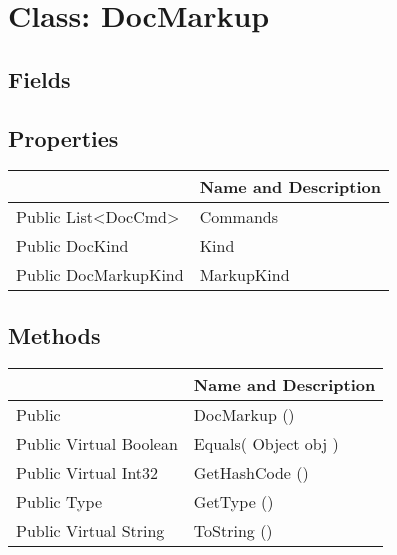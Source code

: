 \documentclass[11pt, oneside, a4paper]{book}
\begin{document}
\hypertarget{SoftwareEngineeringTools.{}Documentation.{}DocMarkup}{}
\section{Class: DocMarkup}

\subsection{Fields}

\subsection{Properties}
\begin{center}
\begin{tabular}{| p{3cm} | p{12cm} | }
\hline
\textbf{ } & \textbf{ Name and Description}\\
\hline
 Public  List<DocCmd> &  Commands\hypertarget{SoftwareEngineeringTools.{}Documentation.{}DocMarkup.{}Commands}{}\\
\hline
 Public  DocKind &  Kind\hypertarget{SoftwareEngineeringTools.{}Documentation.{}DocMarkup.{}Kind}{}\\
\hline
 Public  DocMarkupKind &  MarkupKind\hypertarget{SoftwareEngineeringTools.{}Documentation.{}DocMarkup.{}MarkupKind}{}\\
\hline
\end{tabular}
\end{center}

\subsection{Methods}
\begin{center}
\begin{tabular}{| p{3cm} | p{12cm} | }
\hline
\textbf{ } & \textbf{ Name and Description}\\
\hline
 Public  &  DocMarkup ()\hypertarget{SoftwareEngineeringTools.{}Documentation.{}DocMarkup.{}DocMarkup}{}\\
\hline
 Public  Virtual  Boolean &  Equals(\hypertarget{SoftwareEngineeringTools.{}Documentation.{}DocMarkup.{}Equals\_Object}{} Object  obj  )\\
\hline
 Public  Virtual  Int32 &  GetHashCode ()\hypertarget{SoftwareEngineeringTools.{}Documentation.{}DocMarkup.{}GetHashCode}{}\\
\hline
 Public  Type &  GetType ()\hypertarget{SoftwareEngineeringTools.{}Documentation.{}DocMarkup.{}GetType}{}\\
\hline
 Public  Virtual  String &  ToString ()\hypertarget{SoftwareEngineeringTools.{}Documentation.{}DocMarkup.{}ToString}{}\\
\hline
\end{tabular}
\end{center}
 
\end{document}
